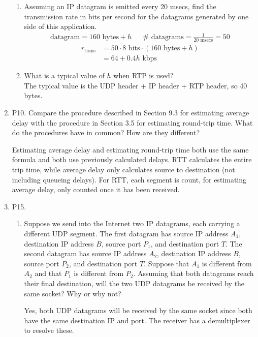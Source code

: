 \documentclass[12pt]{article}
\begin{document}
\begin{enumerate}
		\begin{enumerate}
			\item Assuming an IP datagram is emitted every 20 msecs, find the transmission rate in bits per second for the datagrams generated by one side of this application.
			\color{CrispBlue}
			\begin{align*}
				\text{datagram} = 160\text{ bytes}+h&&\# \text{ datagrams}= \frac{1}{20\text{ msecs}}=50
			\end{align*}
			\begin{align*}
				r_{\text{trans}}&=50 \cdot 8\text{ bits}\cdot (160\text{ bytes}+h)\\
				&=64+0.4h \text{ kbps}
			\end{align*}
			\color{black}
			\item What is a typical value of \(h\) when RTP is used?\\[1em]
			\color{CrispBlue}
			The typical value is the UDP header + IP header + RTP header, so 40 bytes.
			\color{black}
		\end{enumerate}
	\item P10. Compare the procedure described in Section 9.3 for estimating average delay with the procedure in Section 3.5 for estimating round-trip time. What do the procedures have in common? How are they different?\par
	\color{CrispBlue}
	Estimating average delay and estimating round-trip time both use the same formula and both use previously calculated delays. RTT calculates the entire trip time, while average delay only calculates source to destination (not including queueing delays). For RTT, each segment is count, for estimating average delay, only counted once it has been received.
	\color{black}
	\item P15.
		\begin{enumerate}
			\item Suppose we send into the Internet two IP datagrams, each carrying a different UDP segment. The first datagram has source IP address \(A_1\), destination IP address \(B\), source port \(P_1\), and destination port \(T\). The second datagram has source IP address \(A_2\), destination IP address \(B\), source port \(P_2\), and destination port \(T\). Suppose that \(A_1\) is different from \(A_2\) and that \(P_1\) is different from \(P_2\). Assuming that both datagrams reach their final destination, will the two UDP datagrams be received by the same socket? Why or why not?\par
			\color{CrispBlue}
			Yes, both UDP datagrams will be received by the same socket since both have the same destination IP and port. The receiver has a demultiplexer to resolve these.

\end{enumerate}
\end{enumerate}
\end{document}
